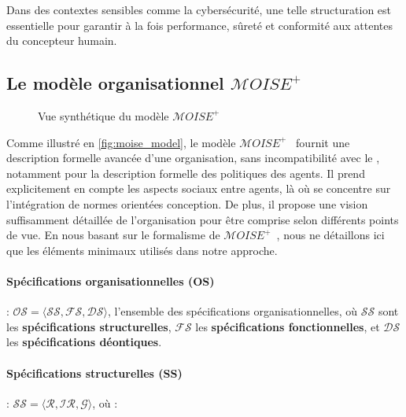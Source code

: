 Dans des contextes sensibles comme la cybersécurité, une telle structuration est essentielle pour garantir à la fois performance, sûreté et conformité aux attentes du concepteur humain.

\subsection{Le modèle organisationnel $\mathcal{M}OISE^+$}

\begin{figure}[h!]
    \centering
    
    \caption{Vue synthétique du modèle $\mathcal{M}OISE^+$}
    \label{fig:moise_model}
\end{figure}

Comme illustré en \autoref{fig:moise_model}, le modèle $\mathcal{M}OISE^+$~\citep{Hubner2002} fournit une description formelle avancée d'une organisation, sans incompatibilité avec le , notamment pour la description formelle des politiques des agents. Il prend explicitement en compte les aspects sociaux entre agents, là où  se concentre sur l'intégration de normes orientées conception. De plus, il propose une vision suffisamment détaillée de l'organisation pour être comprise selon différents points de vue.  
En nous basant sur le formalisme de $\mathcal{M}OISE^+$~\citep{Hubner2007}, nous ne détaillons ici que les éléments minimaux utilisés dans notre approche.

\paragraph{\textbf{Spécifications organisationnelles (OS)}} : $\mathcal{OS} = \langle \mathcal{SS}, \mathcal{FS}, \mathcal{DS} \rangle$, l'ensemble des spécifications organisationnelles, où $\mathcal{SS}$ sont les \textbf{spécifications structurelles}, $\mathcal{FS}$ les \textbf{spécifications fonctionnelles}, et $\mathcal{DS}$ les \textbf{spécifications déontiques}.

\paragraph{\textbf{Spécifications structurelles (SS)}} : $\mathcal{SS} = \langle \mathcal{R}, \mathcal{IR}, \mathcal{G} \rangle$, où :

